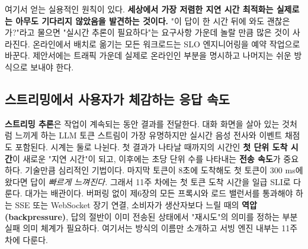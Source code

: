 여기서 얻는 실용적인 원칙이 있다. \textbf{세상에서 가장 저렴한 지연 시간 최적화는 실제로는 아무도 기다리지 않았음을 발견하는 것이다.} "이 답이 한 시간 뒤에 와도 괜찮은가?"라고 물으면 "실시간 추론이 필요하다"는 요구사항 가운데 놀랄 만큼 많은 것이 사라진다. 온라인에서 배치로 옮기는 모든 워크로드는 SLO 엔지니어링을 예약 작업으로 바꾼다. 제안서에는 트래픽 가운데 실제로 온라인인 부분을 명시하고 나머지는 쉬운 방식으로 보내야 한다.

\subsection*{스트리밍에서 사용자가 체감하는 응답 속도}

\textbf{스트리밍 추론}은 작업이 계속되는 동안 결과를 전달한다. 대화 화면을 살아 있는 것처럼 느끼게 하는 LLM 토큰 스트림이 가장 유명하지만 실시간 음성 전사와 이벤트 채점도 포함된다. 시계는 둘로 나뉜다. 첫 결과가 나타날 때까지의 시간인 \textbf{첫 단위 도착 시간}이 새로운 "지연 시간"이 되고, 이후에는 초당 단위 수를 나타내는 \textbf{전송 속도}가 중요하다. 기술만큼 심리적인 기법이다. 마지막 토큰이 8초에 도착해도 첫 토큰이 300 ms에 왔다면 답이 \textit{빠르게 느껴진다.} 그래서 11주 차에는 첫 토큰 도착 시간을 일급 SLI로 다룬다. 대가는 배관이다. 버퍼링 없이 제6장의 모든 프록시와 로드 밸런서를 통과해야 하는 SSE 또는 WebSocket 장기 연결, 소비자가 생산자보다 느릴 때의 \textbf{역압(backpressure)}, 답의 절반이 이미 전송된 상태에서 "재시도"의 의미를 정하는 부분 실패 의미 체계가 필요하다. 여기서는 방식의 이름만 소개하고 서빙 엔진 내부는 11주 차에 다룬다.

